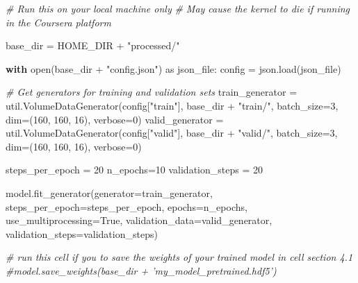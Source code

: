 \documentclass[11pt]{article}
\newenvironment{Shaded}{}{}
\newcommand{\DecValTok}[1]{\textcolor[rgb]{0.25,0.63,0.44}{{#1}}}
\newcommand{\StringTok}[1]{\textcolor[rgb]{0.25,0.44,0.63}{{#1}}}
\newcommand{\CommentTok}[1]{\textcolor[rgb]{0.38,0.63,0.69}{\textit{{#1}}}}
\newcommand{\NormalTok}[1]{{#1}}
\newcommand{\ImportTok}[1]{{#1}}
\newcommand{\VariableTok}[1]{\textcolor[rgb]{0.10,0.09,0.49}{{#1}}}
\newcommand{\ControlFlowTok}[1]{\textcolor[rgb]{0.00,0.44,0.13}{\textbf{{#1}}}}
\newcommand{\OperatorTok}[1]{\textcolor[rgb]{0.40,0.40,0.40}{{#1}}}
\newcommand{\BuiltInTok}[1]{{#1}}
\begin{document}
    \begin{Shaded}
\begin{Highlighting}[]
\CommentTok{# Run this on your local machine only}
\CommentTok{# May cause the kernel to die if running in the Coursera platform}

\NormalTok{base_dir }\OperatorTok{=}\NormalTok{ HOME_DIR }\OperatorTok{+} \StringTok{"processed/"}

\ControlFlowTok{with} \BuiltInTok{open}\NormalTok{(base_dir }\OperatorTok{+} \StringTok{"config.json"}\NormalTok{) }\ImportTok{as}\NormalTok{ json_file:}
\NormalTok{    config }\OperatorTok{=}\NormalTok{ json.load(json_file)}

\CommentTok{# Get generators for training and validation sets}
\NormalTok{train_generator }\OperatorTok{=}\NormalTok{ util.VolumeDataGenerator(config[}\StringTok{"train"}\NormalTok{], base_dir }\OperatorTok{+} \StringTok{"train/"}\NormalTok{, batch_size}\OperatorTok{=}\DecValTok{3}\NormalTok{, dim}\OperatorTok{=}\NormalTok{(}\DecValTok{160}\NormalTok{, }\DecValTok{160}\NormalTok{, }\DecValTok{16}\NormalTok{), verbose}\OperatorTok{=}\DecValTok{0}\NormalTok{)}
\NormalTok{valid_generator }\OperatorTok{=}\NormalTok{ util.VolumeDataGenerator(config[}\StringTok{"valid"}\NormalTok{], base_dir }\OperatorTok{+} \StringTok{"valid/"}\NormalTok{, batch_size}\OperatorTok{=}\DecValTok{3}\NormalTok{, dim}\OperatorTok{=}\NormalTok{(}\DecValTok{160}\NormalTok{, }\DecValTok{160}\NormalTok{, }\DecValTok{16}\NormalTok{), verbose}\OperatorTok{=}\DecValTok{0}\NormalTok{)}

\NormalTok{steps_per_epoch }\OperatorTok{=} \DecValTok{20}
\NormalTok{n_epochs}\OperatorTok{=}\DecValTok{10}
\NormalTok{validation_steps }\OperatorTok{=} \DecValTok{20}

\NormalTok{model.fit_generator(generator}\OperatorTok{=}\NormalTok{train_generator,}
\NormalTok{        steps_per_epoch}\OperatorTok{=}\NormalTok{steps_per_epoch,}
\NormalTok{        epochs}\OperatorTok{=}\NormalTok{n_epochs,}
\NormalTok{        use_multiprocessing}\OperatorTok{=}\VariableTok{True}\NormalTok{,}
\NormalTok{        validation_data}\OperatorTok{=}\NormalTok{valid_generator,}
\NormalTok{        validation_steps}\OperatorTok{=}\NormalTok{validation_steps)}

\CommentTok{# run this cell if you to save the weights of your trained model in cell section 4.1}
\CommentTok{#model.save_weights(base_dir + 'my_model_pretrained.hdf5')}
\end{Highlighting}
\end{Shaded}
\end{document}
